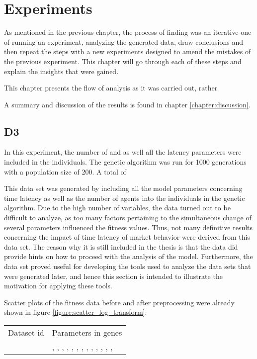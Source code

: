 \chapter{Experiments}\label{chapter:experiments_and_results}
As mentioned in the previous chapter, the process of finding was an iterative one of running an experiment, analyzing the generated data, draw conclusions and then repeat the steps with a new experiments designed to amend the mistakes of the previous experiment. This chapter will go through each of these steps and explain the insights that were gained.

This chapter presents the flow of analysis as it was carried out, rather 

A summary and discussion of the results is found in chapter \ref{chapter:discussion}.


\section{D3}
In this experiment, the number of \ssmmnAgents and \scnAgents as well all the latency parameters were included in the individuals. The genetic algorithm was run for 1000 generations with a population size of 200. A total of 


This data set was generated by including all the model parameters concerning time latency as well as the number of agents into the individuals in the genetic algorithm. Due to the high number of variables, the data turned out to be difficult to analyze, as too many factors pertaining to the simultaneous change of several parameters influenced the fitness values. Thus, not many definitive results concerning the impact of time latency of market behavior were derived from this data set. The reason why it is still included in the thesis is that the data did provide hints on how to proceed with the analysis of the model. Furthermore, the data set proved useful for developing the tools used to analyze the data sets that were generated later, and hence this section is intended to illustrate the motivation for applying these tools.

Scatter plots of the fitness data before and after preprocessing were already shown in figure \ref{figure:scatter_log_transform}.

\begin{table}
	\centering
	\begin{tabular}{l|l}
	Dataset id & Parameters in genes\\
	\dthree & \sclatencymu, \sclatencys, \scnAgents, \scthinkmu, \scthinks, \sctimehorizonmu, \sctimehorizons, \scwaitTimeBetweenTradingmu, \scwaitTimeBetweenTradings, \ssmmlatencymu, \ssmmlatencys, \ssmmnAgents, \ssmmthinkmu, \ssmmthinks	
	\end{tabular}
\end{table}

